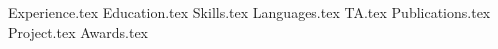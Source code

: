 \documentclass[11pt, a4paper]{awesome-cv}
\newcommand*{\sectiondir}{resume/}
\begin{document}
\makecvheader
\hspace{14.17 cm}


{Experience.tex}
\vspace{0.5 cm}
{Education.tex}
\vspace{0.5 cm}
{Skills.tex}
\vspace{0.5 cm}
{Languages.tex}
\vspace{0.5 cm}
{TA.tex}
\vspace{0.5 cm}
{Publications.tex}
\vspace{0.5 cm}
{Project.tex}
\vspace{0.5 cm}
{Awards.tex}
\vspace{0.5 cm}
\end{document}
